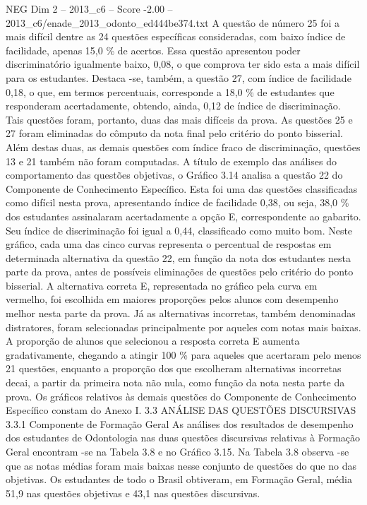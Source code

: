 \begin{textsample}{NEG Dim 2 – 2013\_c6 – Score -2.00 – 2013\_c6/enade\_2013\_odonto\_ed444be374.txt}
A questão de número 25 foi a mais difícil dentre as 24 questões específicas consideradas, com baixo índice de facilidade, apenas 15,0 \% de acertos.
Essa questão apresentou poder discriminatório igualmente baixo, 0,08, o que comprova ter sido esta a mais difícil para os estudantes.
Destaca -se, também, a questão 27, com índice de facilidade 0,18, o que, em termos percentuais, corresponde a 18,0 \% de estudantes que responderam acertadamente, obtendo, ainda, 0,12 de índice de discriminação.
Tais questões foram, portanto, duas das mais difíceis da prova.
As questões 25 e 27 foram eliminadas do cômputo da nota final pelo critério do ponto bisserial.
Além destas duas, as demais questões com índice fraco de discriminação, questões 13 e 21 também não foram computadas.
A título de exemplo das análises do comportamento das questões objetivas, o Gráfico 3.14 analisa a questão 22 do Componente de Conhecimento Específico.
Esta foi uma das questões classificadas como difícil nesta prova, apresentando índice de facilidade 0,38, ou seja, 38,0 \% dos estudantes assinalaram acertadamente a opção E, correspondente ao gabarito.
Seu índice de discriminação foi igual a 0,44, classificado como muito bom.
Neste gráfico, cada uma das cinco curvas representa o percentual de respostas em determinada alternativa da questão 22, em função da nota dos estudantes nesta parte da prova, antes de possíveis eliminações de questões pelo critério do ponto bisserial.
A alternativa correta E, representada no gráfico pela curva em vermelho, foi escolhida em maiores proporções pelos alunos com desempenho melhor nesta parte da prova.
Já as alternativas incorretas, também denominadas distratores, foram selecionadas principalmente por aqueles com notas mais baixas.
A proporção de alunos que selecionou a resposta correta E aumenta gradativamente, chegando a atingir 100 \% para aqueles que acertaram pelo menos 21 questões, enquanto a proporção dos que escolheram alternativas incorretas decai, a partir da primeira nota não nula, como função da nota nesta parte da prova.
Os gráficos relativos às demais questões do Componente de Conhecimento Específico constam do Anexo I. 3.3 ANÁLISE DAS QUESTÕES DISCURSIVAS 3.3.1 Componente de Formação Geral As análises dos resultados de desempenho dos estudantes de Odontologia nas duas questões discursivas relativas à Formação Geral encontram -se na Tabela 3.8 e no Gráfico 3.15.
Na Tabela 3.8 observa -se que as notas médias foram mais baixas nesse conjunto de questões do que no das objetivas.
Os estudantes de todo o Brasil obtiveram, em Formação Geral, média 51,9 nas questões objetivas e 43,1 nas questões discursivas.

\end{textsample}
